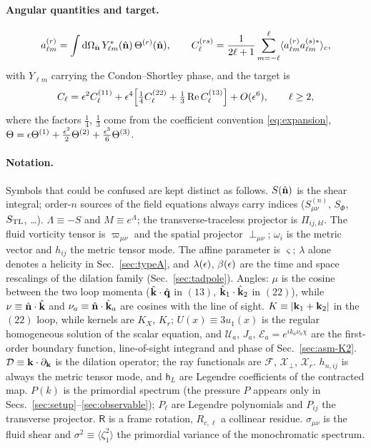 \paragraph{Angular quantities and target.}
\begin{equation}
a^{(r)}_{\ell m}=\int\mathrm d\Omega_{\hat{\mathbf n}}\,Y^*_{\ell m}(\hat{\mathbf n})\,\Theta^{(r)}(\hat{\mathbf n}),\qquad
C^{(rs)}_\ell=\frac1{2\ell+1}\sum_{m=-\ell}^{\ell}\langle a^{(r)}_{\ell m}a^{(s)*}_{\ell m}\rangle_c,
\label{eq:cl_def}
\end{equation}
with $Y_{\ell m}$ carrying the Condon--Shortley phase, and the target is
\begin{equation}
C_\ell=\epsilon^2C^{(11)}_\ell+\epsilon^4\Big[\tfrac14C^{(22)}_\ell+\tfrac13\operatorname{Re} C^{(13)}_\ell\Big]+O(\epsilon^6),\qquad \ell\ge2 ,
\label{eq:cl_target}
\end{equation}
where the factors $\tfrac14$, $\tfrac13$ come from the coefficient convention \eqref{eq:expansion}, $\Theta=\epsilon\Theta^{(1)}+\tfrac{\epsilon^2}2\Theta^{(2)}+\tfrac{\epsilon^3}6\Theta^{(3)}$.

\paragraph{Notation.}  Symbols that could be confused are kept distinct as follows.  $S(\hat{\mathbf n})$ is the shear integral; order-$n$
sources of the field equations always carry indices ($S^{(n)}_{\mu\nu}$, $S_\Phi$, $S_{\rm TL}$, \ldots).  $\Lambda\equiv-S$ and
$M\equiv e^\Lambda$; the transverse-traceless projector is $\Pi_{ij,kl}$.  The fluid vorticity tensor is $\varpi_{\mu\nu}$ and the
spatial projector $\perp_{\mu\nu}$; $\omega_i$ is the metric vector and $h_{ij}$ the metric tensor mode.  The affine parameter is
$\varsigma$; $\lambda$ alone denotes a helicity in Sec.~\ref{sec:typeA}, and $\lambda(\epsilon)$, $\beta(\epsilon)$ are the time and space
rescalings of the dilation family (Sec.~\ref{sec:tadpole}).  Angles: $\mu$ is the cosine between the two loop momenta ($\hat{\mathbf k}\cdot\hat{\mathbf q}$ in $(13)$, $\hat{\mathbf k}_1\cdot\hat{\mathbf k}_2$ in $(22)$), while $\nu\equiv\hat{\mathbf n}\cdot\hat{\mathbf k}$ and
$\nu_a\equiv\hat{\mathbf n}\cdot\hat{\mathbf k}_a$ are cosines with the line of sight.  $K\equiv|\mathbf k_1+\mathbf k_2|$ in the $(22)$ loop, while kernels are $K_X$, $K_r$; $U(x)\equiv3u_1(x)$
is the regular homogeneous solution of the scalar equation, and $\mathcal U_a$, $J_a$, $\mathcal E_a=e^{ik_a\nu_a\chi}$ are the first-order boundary function,
line-of-sight integrand and phase of Sec.~\ref{sec:asm-K2}.  $\mathcal D\equiv\mathbf k\cdot\partial_\mathbf k$ is the dilation operator; the ray functionals are
$\mathcal F$, $\mathcal X_\perp$, $\mathcal X_r$.  $h_{n,ij}$ is always the metric tensor mode, and $\mathsf h_L$ are Legendre coefficients of the contracted map.
$P(k)$ is the primordial spectrum (the pressure $P$ appears only in Secs.~\ref{sec:setup}--\ref{sec:observable}); $P_\ell$ are Legendre polynomials and
$P_{ij}$ the transverse projector.  $\mathsf R$ is a frame rotation, $R_{c,\ell}$ a collinear residue.  $\sigma_{\mu\nu}$ is the fluid shear and
$\sigma^2\equiv\langle\zeta_1^2\rangle$ the primordial variance of the monochromatic spectrum.
